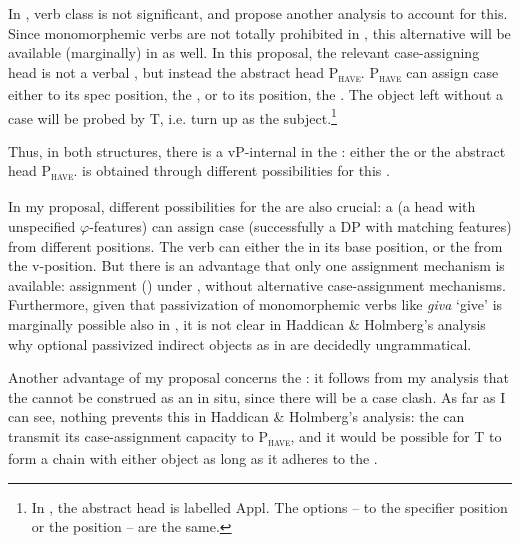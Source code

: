 \documentclass[output=paper]{langscibook}
\begin{document}
In , verb class is not significant, and \citet{HaddicanHolmberg2019} propose another analysis to account for this. Since  monomorphemic  verbs are not totally prohibited in , this alternative will be available (marginally) in  as well. In this proposal, the relevant case-assigning head is not a verbal , but instead the abstract head P\textsc{\textsubscript{have}}. P\textsc{\textsubscript{have}} can assign case either to its spec position, the , or to its  position, the . The object left without a case will be probed by T, i.e. turn up as the subject.\footnote{In \citet{HolmbergEtAl2019}, the abstract head is labelled Appl. The options –  to the specifier position or the  position – are the same.} 



Thus, in both structures, there is a vP-internal  in the : either the  or the abstract head P\textsc{\textsubscript{have}}.  is obtained through different possibilities for this . 



In my proposal, different possibilities for the  are also crucial: a  (a head with unspecified $\varphi ${}-features) can assign case (successfully  a DP with matching features) from different positions. The verb can either  the  in its base position, or the  from the v-position. But there is an advantage that only one assignment mechanism is available: assignment () under , without alternative case-assignment mechanisms. Furthermore, given that passivization of monomorphemic verbs like \textit{giva} ‘give’ is marginally possible also in , it is not clear in Haddican \& Holmberg’s analysis why optional passivized indirect objects as in  are decidedly ungrammatical.



Another advantage of my proposal concerns the : it follows from my analysis that the  cannot be construed as an  in situ, since there will be a case clash. As far as I can see, nothing prevents this in Haddican \& Holmberg’s analysis: the  can transmit its case-assignment capacity to P\textsc{\textsubscript{have}}, and it would be possible for T to form a chain with either object as long as it adheres to the .
\end{document}

